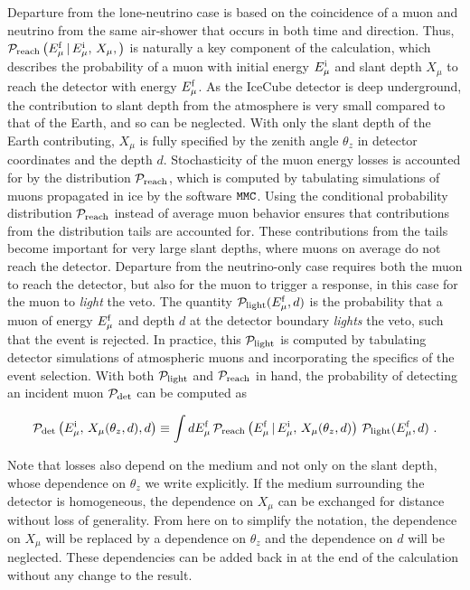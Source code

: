 Departure from the lone-neutrino case is based on the coincidence of a muon and neutrino from the same air-shower that occurs in both time and direction.
Thus, ${\cal P}_{\rm reach}\left(E_{\mu}^{\rm f} \, | \, E_{\mu}^{\rm i} , \, X_\mu, \right)$ is naturally a key component of the calculation, which describes the probability of a muon with initial energy $E_{\mu}^{\rm i}$ and slant depth $X_\mu$ to reach the detector with energy $E_{\mu}^{\rm f}$.
As the IceCube detector is deep underground, the contribution to slant depth from the atmosphere is very small compared to that of the Earth, and so can be neglected.
With only the slant depth of the Earth contributing, $X_\mu$ is fully specified by the zenith angle $\theta_z$ in detector coordinates and the depth $d$.
Stochasticity of the muon energy losses is accounted for by the distribution ${\cal P}_{\rm reach}$, which is computed by tabulating simulations of muons propagated in ice by the software $\texttt{MMC}$.
Using the conditional probability distribution ${\cal P}_{\rm reach}$ instead of average muon behavior ensures that contributions from the distribution tails are accounted for.
These contributions from the tails become important for very large slant depths, where muons on average do not reach the detector.
Departure from the neutrino-only case requires both the muon to reach the detector, but also for the muon to trigger a response, in this case for the muon to {\it light} the veto.
The quantity ${\cal P}_{\rm light}(E_{\mu}^{\rm f},d)$ is the probability that a muon of energy $E_{\mu}^{\rm f}$ and depth $d$ at the detector boundary {\it lights} the veto, such that the event is rejected.
In practice, this ${\cal P}_{\rm light}$ is computed by tabulating detector simulations of atmospheric muons and incorporating the specifics of the event selection.
With both ${\cal P}_{\rm light}$ and ${\cal P}_{\rm reach}$ in hand, the probability of detecting an incident muon ${\cal P}_{\rm det}$ can be computed as 

\begin{equation}
\label{eq:PrPl}
{\cal P}_{\rm det}\left(E_{\mu}^{\rm i} , \, X_\mu(\theta_z, d), d\right) \equiv \int dE_{\mu}^{\rm f} \, {\cal P}_{\rm reach}\left(E_{\mu}^{\rm f} \, | \, E_{\mu}^{\rm i} , \, X_\mu(\theta_z, d)\right) \, {\cal P}_{\rm light} (E_{\mu}^{\rm f}, d) ~.
\end{equation}

Note that losses also depend on the medium and not only on the slant depth, whose dependence on $\theta_z$ we write explicitly. If the medium surrounding the detector is homogeneous, the dependence on $X_\mu$ can be exchanged for distance without loss of generality.
From here on to simplify the notation, the dependence on $X_\mu$ will be replaced by a dependence on $\theta_z$ and the dependence on $d$ will be neglected.
These dependencies can be added back in at the end of the calculation without any change to the result.

